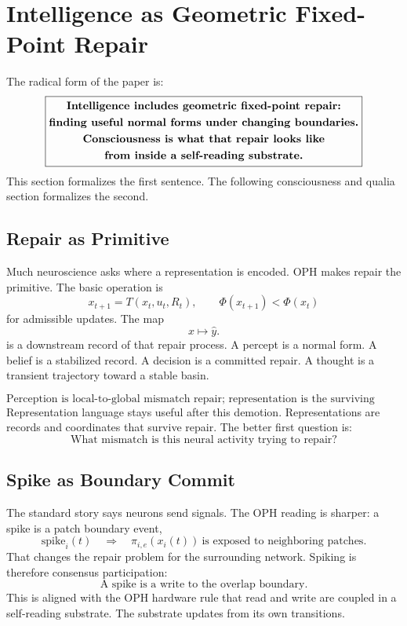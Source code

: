 \documentclass[11pt]{article}
\theoremstyle{remark}
\theoremstyle{plain}
\begin{document}
\section{Intelligence as Geometric Fixed-Point Repair}

The radical form of the paper is:
\[
\boxed{
\begin{gathered}
\text{\bfseries Intelligence includes geometric fixed-point repair:}\\
\text{\bfseries finding useful normal forms under changing boundaries.}\\
\text{\bfseries Consciousness is what that repair looks like}\\
\text{\bfseries from inside a self-reading substrate.}
\end{gathered}
}
\]
This section formalizes the first sentence. The following consciousness and qualia section formalizes the second.

\subsection{Repair as Primitive}

Much neuroscience asks where a representation is encoded. OPH makes repair the primitive. The basic operation is
\[
x_{t+1}=T(x_t,u_t,R_t),
\qquad
\Phi(x_{t+1})<\Phi(x_t)
\]
for admissible updates. The map
\[
x\mapsto \hat y.
\]
is a downstream record of that repair process. A percept is a normal form. A belief is a stabilized record. A decision is a committed repair. A thought is a transient trajectory toward a stable basin.

\[
\boxed{
\text{Perception is local-to-global mismatch repair; representation is the surviving record.}
}
\]
Representation language stays useful after this demotion. Representations are records and coordinates that survive repair. The better first question is:
\[
\boxed{
\text{What mismatch is this neural activity trying to repair?}
}
\]

\subsection{Spike as Boundary Commit}

The standard story says neurons send signals. The OPH reading is sharper: a spike is a patch boundary event,
\[
\mathrm{spike}_i(t)
\quad\Longrightarrow\quad
\pi_{i,e}(x_i(t))\ \text{is exposed to neighboring patches}.
\]
That changes the repair problem for the surrounding network. Spiking is therefore consensus participation:
\[
\boxed{
\text{A spike is a write to the overlap boundary.}
}
\]
This is aligned with the OPH hardware rule that read and write are coupled in a self-reading substrate. The substrate updates from its own transitions.
\end{document}
